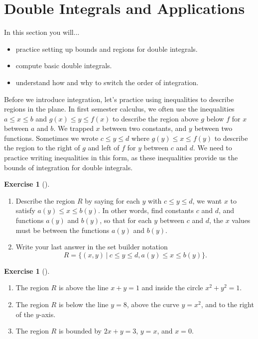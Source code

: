 \documentclass[10pt,]{book}
\theoremstyle{plain}
\theoremstyle{definition}
\theoremstyle{definition}
\theoremstyle{definition}
\theoremstyle{definition}
\newtheorem{exploration}[project]{Exercise}
\theoremstyle{definition}
\numberwithin{equation}{section}
\begin{document}
\section[{Double Integrals and Applications}]{Double Integrals and Applications}\label{section-37}
In this section you will... \leavevmode%
\begin{itemize}[label=\textbullet]
\item{}practice setting up bounds and regions for double integrals.%
\item{}compute basic double integrals.%
\item{}understand how and why to switch the order of integration.%
\end{itemize}
%
\par
Before we introduce integration, let's practice using inequalities to describe regions in the plane. In first semester calculus, we often use the inequalities \(a\leq x\leq b\) and \(g(x)\leq y\leq f(x)\) to describe the region above \(g\) below \(f\) for \(x\) between \(a\) and \(b\). We trapped \(x\) between two constants, and \(y\) between two functions. Sometimes we wrote \(c\leq y\leq d\) where \(g(y)\leq x\leq f(y)\) to describe the region to the right of \(g\) and left of \(f\) for \(y\) between \(c\) and \(d\). We need to practice writing inequalities in this form, as these inequalities provide us the bounds of integration for double integrals.%
\begin{exploration}[]\label{exploration-245}
\leavevmode%
\begin{enumerate}[font=\bfseries,label=(\alph*),ref=\alph*]
\item\label{task-661} Describe the region \(R\) by saying for each \(y\) with \(c\leq y\leq d\), we want \(x\) to satisfy \(a(y)\leq x\leq b(y)\). In other words, find constants \(c\) and \(d\), and functions \(a(y)\) and \(b(y)\), so that for each \(y\) between \(c\) and \(d\), the \(x\) values must be between the functions \(a(y)\) and \(b(y)\).%
\item\label{task-662} Write your last answer in the set builder notation%
\begin{equation*}
R=\{(x,y)\ | \ c\leq y\leq d, a(y)\leq x\leq b(y)\}.
\end{equation*}
%
\end{enumerate}
\end{exploration}
\begin{exploration}[]\label{exploration-246}
\leavevmode%
\begin{enumerate}[font=\bfseries,label=(\alph*),ref=\alph*]
\item\label{task-663} The region \(R\) is above the line \(x+y=1\) and inside the circle \(x^2+y^2=1\).%
\item\label{task-664} The region \(R\) is below the line \(y=8\), above the curve \(y=x^2\), and to the right of the \(y\)-axis.%
\item\label{task-665} The region \(R\) is bounded by \(2x+y=3\), \(y=x\), and \(x=0\).%
\end{enumerate}
\end{exploration}
\end{document}
